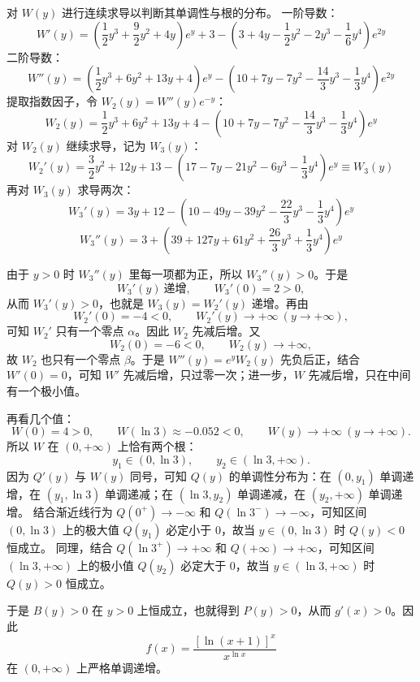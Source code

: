 \begin{solution}
对 $W(y)$ 进行连续求导以判断其单调性与根的分布。
一阶导数：
$$W'(y) = \left(\frac{1}{2}y^3 + \frac{9}{2}y^2 + 4y\right)e^y + 3 - \left(3 + 4y - \frac{1}{2}y^2 - 2y^3 - \frac{1}{6}y^4\right)e^{2y}$$
二阶导数：
$$W''(y) = \left(\frac{1}{2}y^3 + 6y^2 + 13y + 4\right)e^y - \left(10 + 7y - 7y^2 - \frac{14}{3}y^3 - \frac{1}{3}y^4\right)e^{2y}$$
提取指数因子，令 $W_2(y) = W''(y)e^{-y}$：
$$W_2(y) = \frac{1}{2}y^3 + 6y^2 + 13y + 4 - \left(10 + 7y - 7y^2 - \frac{14}{3}y^3 - \frac{1}{3}y^4\right)e^y$$
对 $W_2(y)$ 继续求导，记为 $W_3(y)$：
$$W_2'(y) = \frac{3}{2}y^2 + 12y + 13 - \left(17 - 7y - 21y^2 - 6y^3 - \frac{1}{3}y^4\right)e^y \equiv W_3(y)$$
再对 $W_3(y)$ 求导两次：
$$W_3'(y) = 3y + 12 - \left(10 - 49y - 39y^2 - \frac{22}{3}y^3 - \frac{1}{3}y^4\right)e^y$$
$$W_3''(y) = 3 + \left(39 + 127y + 61y^2 + \frac{26}{3}y^3 + \frac{1}{3}y^4\right)e^y$$

由于 \(y>0\) 时 \(W_3''(y)\) 里每一项都为正，所以 \(W_3''(y)>0\)。于是
\[
W_3'(y)\ \text{递增},\qquad W_3'(0)=2>0,
\]
从而 \(W_3'(y)>0\)，也就是 \(W_3(y)=W_2'(y)\) 递增。再由
\[
W_2'(0)=-4<0,\qquad W_2'(y)\to+\infty\ (y\to+\infty),
\]
可知 \(W_2'\) 只有一个零点 \(\alpha\)。因此 \(W_2\) 先减后增。又
\[
W_2(0)=-6<0,\qquad W_2(y)\to+\infty,
\]
故 \(W_2\) 也只有一个零点 \(\beta\)。于是 \(W''(y)=e^yW_2(y)\) 先负后正，结合 \(W'(0)=0\)，可知 \(W'\) 先减后增，只过零一次；进一步，\(W\) 先减后增，只在中间有一个极小值。

再看几个值：
\[
W(0) = 4 > 0,\qquad W(\ln 3) \approx -0.052 < 0,\qquad W(y)\to+\infty\ (y\to+\infty).
\]
所以 \(W\) 在 \((0,+\infty)\) 上恰有两个根：
\[
y_1 \in (0, \ln 3), \qquad y_2 \in (\ln 3, +\infty).
\]
因为 $Q'(y)$ 与 $W(y)$ 同号，可知 $Q(y)$ 的单调性分布为：在 $(0, y_1)$ 单调递增，在 $(y_1, \ln 3)$ 单调递减；在 $(\ln 3, y_2)$ 单调递减，在 $(y_2, +\infty)$ 单调递增。
结合渐近线行为 $Q(0^+) \to -\infty$ 和 $Q(\ln 3^-) \to -\infty$，可知区间 $(0, \ln 3)$ 上的极大值 $Q(y_1)$ 必定小于 $0$，故当 $y \in (0, \ln 3)$ 时 $Q(y) < 0$ 恒成立。
同理，结合 $Q(\ln 3^+) \to +\infty$ 和 $Q(+\infty) \to +\infty$，可知区间 $(\ln 3, +\infty)$ 上的极小值 $Q(y_2)$ 必定大于 $0$，故当 $y \in (\ln 3, +\infty)$ 时 $Q(y) > 0$ 恒成立。

于是 \(B(y)>0\) 在 \(y>0\) 上恒成立，也就得到 \(P(y)>0\)，从而 \(g'(x)>0\)。因此
\[
f(x) = \frac{[\ln(x+1)]^x}{x^{\ln x}}
\]
在 \((0,+\infty)\) 上严格单调递增。
\end{solution}

